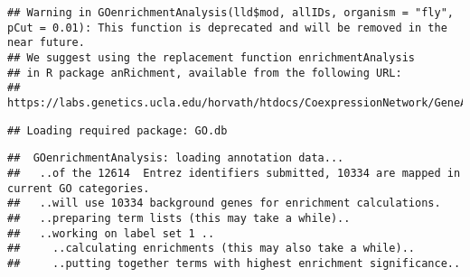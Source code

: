 \documentclass[]{article}
\newenvironment{Shaded}{\begin{snugshade}}{\end{snugshade}}
\newcommand{\CommentTok}[1]{\textcolor[rgb]{0.56,0.35,0.01}{\textit{#1}}}
\newcommand{\DataTypeTok}[1]{\textcolor[rgb]{0.13,0.29,0.53}{#1}}
\newcommand{\FloatTok}[1]{\textcolor[rgb]{0.00,0.00,0.81}{#1}}
\newcommand{\KeywordTok}[1]{\textcolor[rgb]{0.13,0.29,0.53}{\textbf{#1}}}
\newcommand{\NormalTok}[1]{#1}
\newcommand{\OperatorTok}[1]{\textcolor[rgb]{0.81,0.36,0.00}{\textbf{#1}}}
\newcommand{\StringTok}[1]{\textcolor[rgb]{0.31,0.60,0.02}{#1}}
\begin{document}
\begin{Shaded}
\end{Shaded}

\begin{verbatim}
## Warning in GOenrichmentAnalysis(lld$mod, allIDs, organism = "fly", pCut = 0.01): This function is deprecated and will be removed in the near future. 
## We suggest using the replacement function enrichmentAnalysis 
## in R package anRichment, available from the following URL:
## https://labs.genetics.ucla.edu/horvath/htdocs/CoexpressionNetwork/GeneAnnotation/
\end{verbatim}

\begin{verbatim}
## Loading required package: GO.db
\end{verbatim}

\begin{verbatim}
##  GOenrichmentAnalysis: loading annotation data...
##   ..of the 12614  Entrez identifiers submitted, 10334 are mapped in current GO categories.
##   ..will use 10334 background genes for enrichment calculations.
##   ..preparing term lists (this may take a while).. 
##   ..working on label set 1 ..
##     ..calculating enrichments (this may also take a while)..
##     ..putting together terms with highest enrichment significance..
\end{verbatim}
\end{document}
